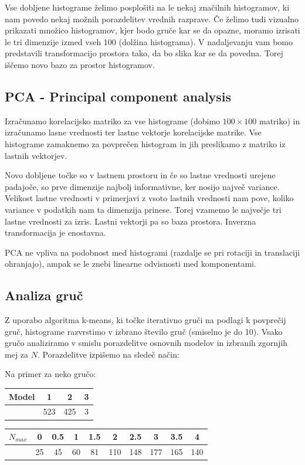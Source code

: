 \documentclass[a4paper]{IEEEtran}
\begin{document}
Vse dobljene histograme želimo posplošiti na le nekaj značilnih histogramov, ki nam povedo nekaj možnih porazdelitev vrednih razprave. Če želimo tudi vizualno prikazati množico histogramov, kjer bodo gruče kar se da opazne, moramo izrisati le tri dimenzije izmed vseh 100 (dolžina histograma). V nadaljevanju vam bomo predstavili transformacijo prostora tako, da bo slika kar se da povedna. Torej iščemo novo bazo za prostor histogramov.

\subsection{PCA - Principal component analysis}

Izračunamo korelacijsko matriko za vse histograme (dobimo $100\times100$ matriko) in izračunamo lasne vrednosti ter lastne vektorje korelacijske matrike. Vse histograme zamaknemo za povprečen histogram in jih preslikamo z matriko iz lastnih vektorjev.

Novo dobljene točke so v lastnem prostoru in če so lastne vrednosti urejene padajoče, so prve dimenzije najbolj informativne, ker nosijo največ variance. Velikost lastne vrednosti v primerjavi z vsoto lastnih vrednosti nam pove, koliko variance v podatkih nam ta dimenzija prinese. Torej vzamemo le največje tri lastne vrednosti za izris. Lastni vektorji pa so baza prostora. Inverzna transformacija je enostavna.

PCA ne vpliva na podobnost med histogrami (razdalje se pri rotaciji in translaciji ohranjajo), ampak se le znebi linearne odvisnosti med komponentami.

\subsection{Analiza gruč}

Z uporabo algoritma k-means, ki točke iterativno gruči na podlagi k povprečij gruč, histograme razvrstimo v izbrano število gruč (smiselno je do 10). Vsako gručo analiziramo v smislu porazdelitve osnovnih modelov in izbranih zgornjih mej za $N$. Porazdelitve izpišemo na sledeč način:

Na primer za neko gručo:
\begin{center}
	\begin{tabular}{ l|ccc } 
	Model & 1 & 2 & 3 \\ \hline
	 & 523 & 425 & 3
	\end{tabular}
\begin{tabular}{ l|ccccccccc } 
	$N_{max}$ & 0 &	0.5&1 &1.5 &2 &2.5 &3 &	3.5&4 \\ \hline
	&25 &45 &60 &81&110 &148 &177 &165 &140
\end{tabular}
\end{center}
\end{document}
